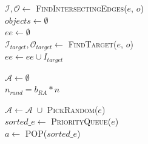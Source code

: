 \begin{algorithm}\footnotesize

\caption{Pick Actions.}\label{algo:pick-actions}


$\mathcal{I}, \mathcal{O} \longleftarrow$ \textsc{FindIntersectingEdges}($e$, $o$)\\

$objects \longleftarrow \emptyset$\\
$ee \longleftarrow \emptyset$\\
$\mathcal{I}_{target}, \mathcal{O}_{target} \longleftarrow$ \textsc{FindTarget}($e$, $o$)\\
 {
    $ee \longleftarrow ee \cup I_{target}$
}

$\mathcal{A} \longleftarrow \emptyset$ \\
$n_{rand} = b_{RA} * n$

 {
     {
        $\mathcal{A} \longleftarrow \mathcal{A} \; \cup$ \textsc{PickRandom}($e$)\\
    }
    $sorted\_e \longleftarrow$ \textsc{PriorityQueue}($e$)\\
     {
        $a \longleftarrow$ \textsc{POP}($sorted\_e$)\\
    }
}


\end{algorithm}